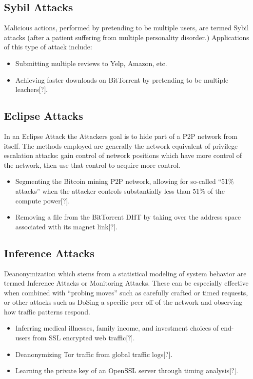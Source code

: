 \documentclass{article}
\begin{document}
\subsection{Sybil Attacks}

Malicious actions, performed by pretending to be multiple users, are termed Sybil attacks (after a patient suffering from multiple personality disorder.) Applications of this type of attack include:

\begin{itemize}
    \item Submitting multiple reviews to Yelp, Amazon, etc.
    \item Achieving faster downloads on BitTorrent by pretending to be multiple leachers[?].
\end{itemize}

\subsection{Eclipse Attacks}

In an Eclipse Attack the Attackers goal is to hide part of a P2P network from itself. The methods employed are generally the network equivalent of privilege escalation attacks: gain control of network positions which have more control of the network, then use that control to acquire more control.

\begin{itemize}
    \item Segmenting the Bitcoin mining P2P network, allowing for so-called “51\% attacks” when the attacker controls substantially less than 51\% of the compute power[?].
    \item Removing a file from the BitTorrent DHT by taking over the address space associated with its magnet link[?].
\end{itemize}

\subsection{Inference Attacks}

Deanonymization which stems from a statistical modeling of system behavior are termed Inference Attacks or Monitoring Attacks. These can be especially effective when combined with “probing moves” such as carefully crafted or timed requests, or other attacks such as DoSing a specific peer off of the network and observing how traffic patterns respond.

\begin{itemize}
    \item Inferring medical illnesses, family income, and investment choices of end- users from SSL encrypted web traffic[?].
    \item Deanonymizing Tor traffic from global traffic logs[?].
    \item Learning the private key of an OpenSSL server through timing analysis[?].
\end{itemize}
\end{document}
